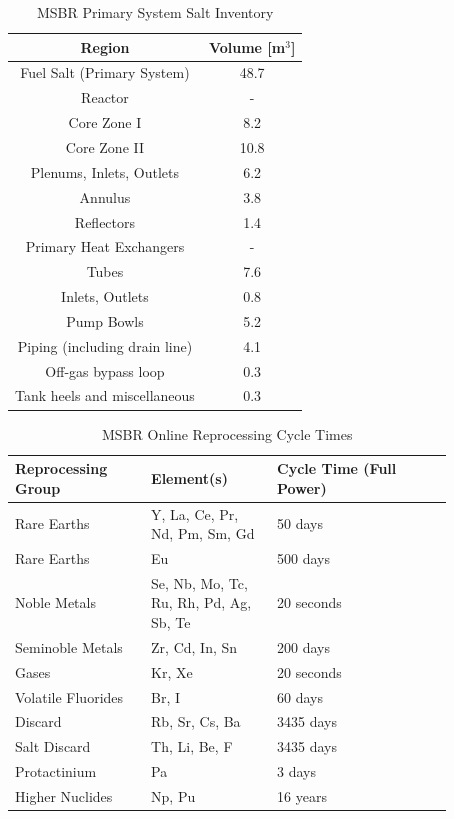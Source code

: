 \begin{table}[H]
\renewcommand{\arraystretch}{1.25}
\caption{MSBR Primary System Salt Inventory \cite{robertson_conceptual_1971}}
\label{tab:msbr_salt_data}
\begin{center}
\begin{tabular}{ | c | c | }
 \hline
 Region & Volume [m$^3$]\\
 \hline
 \hline
 Fuel Salt (Primary System) & 48.7\\
 \hline
 Reactor & -\\
 Core Zone I & 8.2\\
 Core Zone II & 10.8\\
 Plenums, Inlets, Outlets & 6.2\\
 Annulus & 3.8\\
 Reflectors & 1.4\\
 \hline
 Primary Heat Exchangers & -\\
 Tubes & 7.6\\
 Inlets, Outlets & 0.8\\
 \hline
 Pump Bowls & 5.2\\
 Piping (including drain line) & 4.1\\
 Off-gas bypass loop & 0.3\\
 Tank heels and miscellaneous & 0.3\\
 \hline
\end{tabular}
\end{center}
\end{table}


\begin{table}[H]
\renewcommand{\arraystretch}{1.25}
\caption{MSBR Online Reprocessing Cycle Times \cite{robertson_conceptual_1971}}
\label{tab:msbr_cycle_times}
\begin{center}
\begin{tabular}{ | p{0.27\linewidth} | p{0.25\linewidth} | p{0.35\linewidth} |}
 \hline
 Reprocessing Group & Element(s) & Cycle Time (Full Power)\\
 \hline
 \hline
 Rare Earths & Y, La, Ce, Pr, Nd, Pm, Sm, Gd & 50 days\\
 Rare Earths & Eu & 500 days\\
 Noble Metals  & Se, Nb, Mo, Tc, Ru, Rh, Pd, Ag, Sb, Te & 20 seconds\\
 Seminoble Metals & Zr, Cd, In, Sn &  200 days\\
 Gases & Kr, Xe & 20 seconds\\
 Volatile Fluorides & Br, I & 60 days\\
 Discard & Rb, Sr, Cs, Ba & 3435 days\\
 Salt Discard & Th, Li, Be, F & 3435 days\\
 Protactinium & Pa & 3 days\\
 Higher Nuclides & Np, Pu & 16 years\\
 \hline
\end{tabular}
\end{center}
\end{table}


